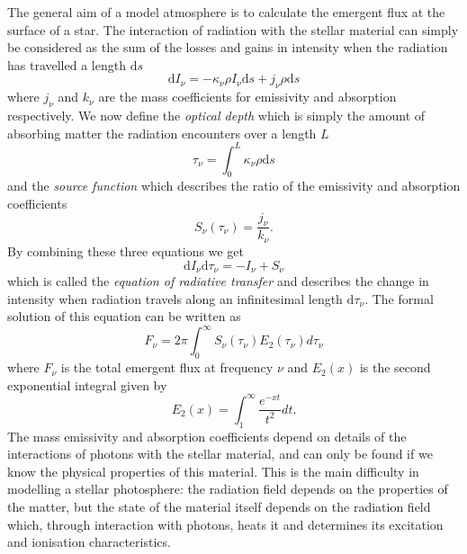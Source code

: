 The general aim of a model atmosphere is to calculate the emergent
flux at the surface of a star. The interaction of radiation with the
stellar material can simply be considered as the sum of the losses and
gains in intensity when the radiation has travelled a length
$\mathrm{d}s$
%
\begin{equation}
\mathrm{d}I_\nu = - \kappa_\nu \rho I_\nu \mathrm{d}s
		  + j_\nu \rho \mathrm{d}s
\end{equation}
%
where $j_\nu$ and $k_\nu$ are the mass coefficients for emissivity and
absorption respectively. We now define the \emph{optical depth}
which is simply the amount of absorbing matter the radiation
encounters over a length $L$
%
\begin{equation}
\tau_\nu = \int_0^L\kappa_\nu \rho \mathrm{d}s
\end{equation}
%
and the \emph{source function} which describes the ratio of the
emissivity and absorption coefficients
%
\begin{equation}
S_\nu(\tau_\nu) = \frac{j_\nu}{k_\nu}\mathrm{.}
\end{equation}
%
By combining these three equations we get
%
\begin{equation}
\mathrm{d}I_\nu \mathrm{d}\tau_\nu = -I_\nu + S_\nu
\end{equation}
%
which is called the \emph{equation of radiative transfer} and
describes the change in intensity when radiation travels along an
infinitesimal length $\mathrm{d}\tau_\nu$. The formal solution of
this equation can be written as
%
\begin{equation}
F_\nu = 2\pi \int_0^\infty S_\nu(\tau_\nu)E_2(\tau_\nu)d\tau_\nu
\end{equation}
%
where $F_\nu$ is the total emergent flux at frequency $\nu$ and
$E_2(x)$ is the second exponential integral given by
%
\begin{equation}
E_2(x) = \int_1^\infty \frac{e^{-xt}}{t^2}dt\mathrm{.}
\end{equation}
%
The mass emissivity and absorption coefficients depend on details of
the interactions of photons with the stellar material, and can only be
found if we know the physical properties of this material. This is the
main difficulty in modelling a stellar photosphere: the radiation
field depends on the properties of the matter, but the state of the
material itself depends on the radiation field which, through
interaction with photons, heats it and determines its excitation and
ionisation characteristics.


